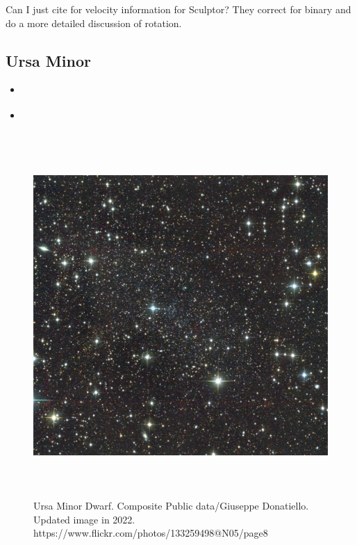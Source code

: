 Can I just cite \citet{arroyo-polonio+2024} for velocity information for
Sculptor? They correct for binary and do a more detailed discussion of
rotation.

\subsection{Ursa Minor}\label{ursa-minor}

\begin{itemize}
\item
  \citet{sestito+2023b}
\item
  \citet{pace+2020}
\end{itemize}

\begin{figure}
\centering
\includegraphics[width=5.41667in,height=5.41667in]{figures/umi_image.jpg}
\caption[Ursa Minor Image]{Ursa Minor Dwarf. Composite Public
data/Giuseppe Donatiello. Updated image in 2022.
https://www.flickr.com/photos/133259498@N05/page8}\label{fig:umi_image}
\end{figure}

